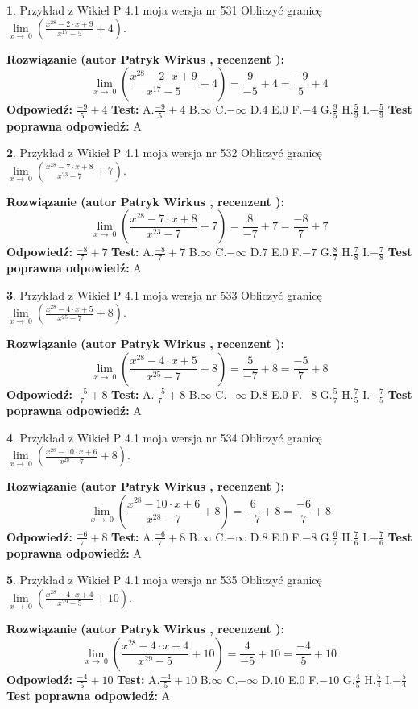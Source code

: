 \documentclass[12pt, a4paper]{article}
\theoremstyle{definition} %
\newtheorem{zad}{}
\newcommand{\zadStart}[1]{\begin{zad}#1\newline}
\newcommand{\zadStop}{\end{zad}}
\newcommand{\rozwStart}[2]{\noindent \textbf{Rozwiązanie (autor #1 , recenzent #2): }\newline}
\newcommand{\rozwStop}{\newline}
\newcommand{\odpStart}{\noindent \textbf{Odpowiedź:}\newline}
\newcommand{\odpStop}{\newline}
\newcommand{\testStart}{\noindent \textbf{Test:}\newline}
\newcommand{\testStop}{\newline}
\newcommand{\kluczStart}{\noindent \textbf{Test poprawna odpowiedź:}\newline}
\newcommand{\kluczStop}{\newline}
\begin{document}
\zadStart{Przykład z Wikieł P 4.1 moja wersja nr 531}
Obliczyć granicę $\lim\limits_{x\to\ 0}(\frac{x^{28}-2 \cdot x +9}{x^{17}-5}+4)$.
\zadStop
\rozwStart{Patryk Wirkus}{}
$$\lim\limits_{x\to\ 0}(\frac{x^{28}-2 \cdot x +9}{x^{17}-5}+4)=\frac{9}{-5}+4=\frac{-9}{5}+4$$
\rozwStop
\odpStart
$\frac{-9}{5}+4$
\odpStop
\testStart
A.$\frac{-9}{5}+4$
B.$\infty$
C.$-\infty$
D.$4$
E.$0$
F.$-4$
G.$\frac{9}{5}$
H.$\frac{5}{9}$
I.$-\frac{5}{9}$
\testStop
\kluczStart
A
\kluczStop



\zadStart{Przykład z Wikieł P 4.1 moja wersja nr 532}
Obliczyć granicę $\lim\limits_{x\to\ 0}(\frac{x^{28}-7 \cdot x +8}{x^{23}-7}+7)$.
\zadStop
\rozwStart{Patryk Wirkus}{}
$$\lim\limits_{x\to\ 0}(\frac{x^{28}-7 \cdot x +8}{x^{23}-7}+7)=\frac{8}{-7}+7=\frac{-8}{7}+7$$
\rozwStop
\odpStart
$\frac{-8}{7}+7$
\odpStop
\testStart
A.$\frac{-8}{7}+7$
B.$\infty$
C.$-\infty$
D.$7$
E.$0$
F.$-7$
G.$\frac{8}{7}$
H.$\frac{7}{8}$
I.$-\frac{7}{8}$
\testStop
\kluczStart
A
\kluczStop



\zadStart{Przykład z Wikieł P 4.1 moja wersja nr 533}
Obliczyć granicę $\lim\limits_{x\to\ 0}(\frac{x^{28}-4 \cdot x +5}{x^{25}-7}+8)$.
\zadStop
\rozwStart{Patryk Wirkus}{}
$$\lim\limits_{x\to\ 0}(\frac{x^{28}-4 \cdot x +5}{x^{25}-7}+8)=\frac{5}{-7}+8=\frac{-5}{7}+8$$
\rozwStop
\odpStart
$\frac{-5}{7}+8$
\odpStop
\testStart
A.$\frac{-5}{7}+8$
B.$\infty$
C.$-\infty$
D.$8$
E.$0$
F.$-8$
G.$\frac{5}{7}$
H.$\frac{7}{5}$
I.$-\frac{7}{5}$
\testStop
\kluczStart
A
\kluczStop



\zadStart{Przykład z Wikieł P 4.1 moja wersja nr 534}
Obliczyć granicę $\lim\limits_{x\to\ 0}(\frac{x^{28}-10 \cdot x +6}{x^{28}-7}+8)$.
\zadStop
\rozwStart{Patryk Wirkus}{}
$$\lim\limits_{x\to\ 0}(\frac{x^{28}-10 \cdot x +6}{x^{28}-7}+8)=\frac{6}{-7}+8=\frac{-6}{7}+8$$
\rozwStop
\odpStart
$\frac{-6}{7}+8$
\odpStop
\testStart
A.$\frac{-6}{7}+8$
B.$\infty$
C.$-\infty$
D.$8$
E.$0$
F.$-8$
G.$\frac{6}{7}$
H.$\frac{7}{6}$
I.$-\frac{7}{6}$
\testStop
\kluczStart
A
\kluczStop



\zadStart{Przykład z Wikieł P 4.1 moja wersja nr 535}
Obliczyć granicę $\lim\limits_{x\to\ 0}(\frac{x^{28}-4 \cdot x +4}{x^{29}-5}+10)$.
\zadStop
\rozwStart{Patryk Wirkus}{}
$$\lim\limits_{x\to\ 0}(\frac{x^{28}-4 \cdot x +4}{x^{29}-5}+10)=\frac{4}{-5}+10=\frac{-4}{5}+10$$
\rozwStop
\odpStart
$\frac{-4}{5}+10$
\odpStop
\testStart
A.$\frac{-4}{5}+10$
B.$\infty$
C.$-\infty$
D.$10$
E.$0$
F.$-10$
G.$\frac{4}{5}$
H.$\frac{5}{4}$
I.$-\frac{5}{4}$
\testStop
\kluczStart
A
\kluczStop
\end{document}
